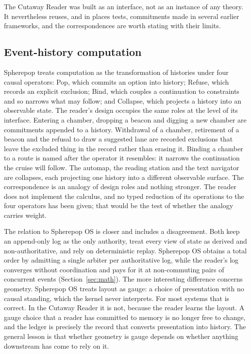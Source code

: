 \documentclass[11pt]{article}
\theoremstyle{remark}
\begin{document}
The Cutaway Reader was built as an interface, not as an instance of any theory. It nevertheless reuses, and in places tests, commitments made in several earlier frameworks, and the correspondences are worth stating with their limits.

\subsection{Event-history computation}

Spherepop treats computation as the transformation of histories under four causal operators: Pop, which commits an option into history; Refuse, which records an explicit exclusion; Bind, which couples a continuation to constraints and so narrows what may follow; and Collapse, which projects a history into an observable state. The reader's design occupies the same roles at the level of its interface. Entering a chamber, dropping a beacon and digging a new chamber are commitments appended to a history. Withdrawal of a chamber, retirement of a beacon and the refusal to draw a suggested lane are recorded exclusions that leave the excluded thing in the record rather than erasing it. Binding a chamber to a route is named after the operator it resembles: it narrows the continuation the cruise will follow. The automap, the reading station and the text navigator are collapses, each projecting one history into a different observable surface. The correspondence is an analogy of design roles and nothing stronger. The reader does not implement the calculus, and no typed reduction of its operations to the four operators has been given; that would be the test of whether the analogy carries weight.

The relation to Spherepop OS is closer and includes a disagreement. Both keep an append-only log as the only authority, treat every view of state as derived and non-authoritative, and rely on deterministic replay. Spherepop OS obtains a total order by admitting a single arbiter per authoritative log, while the reader's log converges without coordination and pays for it at non-commuting pairs of concurrent events (Section~\ref{sec:math}). The more interesting difference concerns geometry. Spherepop OS treats layout as gauge: a choice of presentation with no causal standing, which the kernel never interprets. For most systems that is correct. In the Cutaway Reader it is not, because the reader learns the layout. A gauge choice that a reader has committed to memory is no longer free to change, and the ledger is precisely the record that converts presentation into history. The general lesson is that whether geometry is gauge depends on whether anything downstream has come to rely on it.
\end{document}
